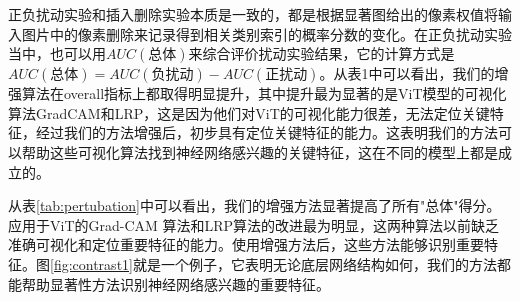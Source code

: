 正负扰动实验和插入删除实验本质是一致的，都是根据显著图给出的像素权值将输入图片中的像素删除来记录得到相关类别索引的概率分数的变化。在正负扰动实验当中，也可以用$AUC(总体)$来综合评价扰动实验结果，它的计算方式是$AUC(总体)=AUC(负扰动)-AUC(正扰动)$。从表1中可以看出，我们的增强算法在overall指标上都取得明显提升，其中提升最为显著的是ViT模型的可视化算法GradCAM和LRP，这是因为他们对ViT的可视化能力很差，无法定位关键特征，经过我们的方法增强后，初步具有定位关键特征的能力。这表明我们的方法可以帮助这些可视化算法找到神经网络感兴趣的关键特征，这在不同的模型上都是成立的。

从表\ref{tab:pertubation}中可以看出，我们的增强方法显著提高了所有"总体"得分。应用于ViT的Grad-CAM 算法和LRP算法的改进最为明显，这两种算法以前缺乏准确可视化和定位重要特征的能力。使用增强方法后，这些方法能够识别重要特征。图\ref{fig:contrast1}就是一个例子，它表明无论底层网络结构如何，我们的方法都能帮助显著性方法识别神经网络感兴趣的重要特征。



